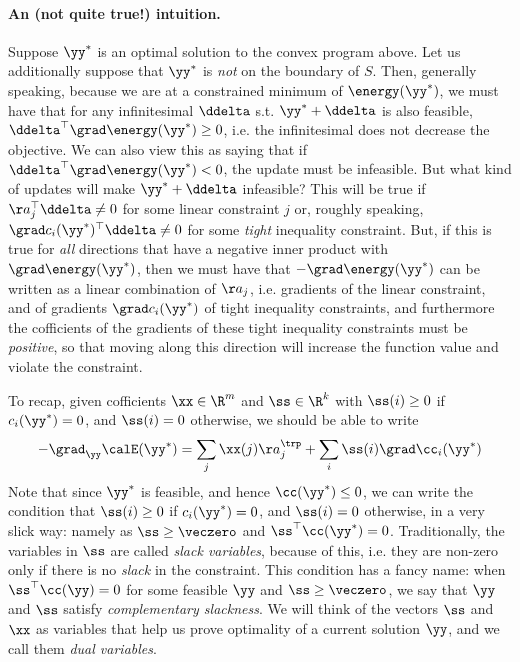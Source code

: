 \paragraph{An (not quite true!) intuition.}
Suppose $\yy^*$ is an optimal solution to the convex program above.
Let us additionally suppose that $\yy^*$ is \emph{not} on the boundary
of $S$.
Then, generally speaking, because we are at a constrained minimum of
$\energy(\yy^*)$, we must have that for any infinitesimal $\ddelta$
s.t. $\yy^*+\ddelta$ is also feasible, $\ddelta^{\top} \grad
\energy(\yy^*) \geq 0$, i.e. the infinitesimal does not decrease the
objective.
We can also view this as saying that if $\ddelta^{\top} \grad
\energy(\yy^*)  < 0$, the update must be infeasible.
But what kind of updates will make $\yy^*+\ddelta$ infeasible?
This will be true if $\aa_j^{\top} \ddelta \neq 0$ for some linear
constraint $j$ or, roughly speaking, $\grad c_i(\yy^*)^{\top} \ddelta \neq 0$ for some
\emph{tight} inequality constraint.
But, if this is true for \emph{all} directions that have a negative
inner product with $\grad \energy(\yy^*)$, then we must have that
$-\grad \energy(\yy^*)$ can be written as a linear combination of
$\aa_j$, i.e. gradients of the linear constraint, and of
gradients $\grad c_i(\yy^*)$ of tight inequality constraints,
and furthermore the cofficients of the gradients of these tight
inequality constraints must be \emph{positive}, so that moving along
this direction will increase the function value and violate the constraint. 

To recap, given cofficients $\xx \in \R^m$ and $\ss \in \R^k$ with
$\ss(i) \geq 0$ if $c_i(\yy^*) = 0$, and $\ss(i) = 0$ otherwise, we
should be able to write
\begin{align}
  -\grad_{\yy}\calE(\yy^*) = \sum_{j} \xx(j) \aa_j^\trp + \sum_{i}
  \ss(i)\grad\cc_i(\yy^*)
  \label{eq:compSlackIntro}
\end{align}
  Note that since $\yy^*$ is feasible, and hence $\cc(\yy^*) \leq 0$,
  we can write the condition that
$\ss(i) \geq 0$ if $c_i(\yy^*) = 0$, and $\ss(i) = 0$ otherwise, in a
very slick way: namely as $\ss \geq \veczero$ and $\ss^{\top}
\cc(\yy^*) = 0$.
Traditionally, the variables in $\ss$ are called \emph{slack
  variables}, because of this, i.e. they are non-zero only if there is
no \emph{slack} in the constraint. 
This condition has a fancy name: when $\ss^{\top}
\cc(\yy) = 0$ for some feasible $\yy$ and $\ss \geq \veczero$, we say
that $\yy$ and $\ss$ satisfy \emph{complementary slackness}.
%
We will think of the vectors $\ss$ and $\xx$ as variables that help
us prove optimality of a current solution $\yy$, and we call them
\emph{dual variables}.

